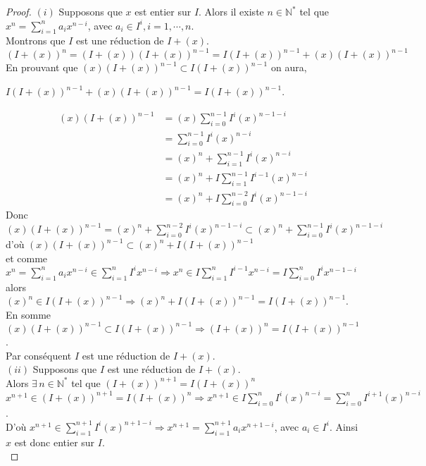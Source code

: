 \begin{proof}
	$(i)$ Supposons que $x$ est entier sur $I$. Alors il existe $n \in \mathbb{N^*}$ tel que $x^n = \displaystyle \sum_{i=1}^{n}{a_i x^{n-i}}$, avec $a_i \in I^i, i=1, \cdots ,n$.\\
	Montrons que $I$ est une réduction de $I + (x)$.\\
	$(I+(x))^n = (I+(x))(I+(x))^{n-1}= I(I+(x))^{n-1} + (x)(I+(x))^{n-1}$\\
	En prouvant que $(x)(I+(x))^{n-1} \subset I(I+(x))^{n-1}$ on aura,
	\begin{center}
		$I(I+(x))^{n-1} + (x)(I+(x))^{n-1} = I(I+(x))^{n-1}$.
	\end{center}
	\begin{align*}
		(x)(I+(x))^{n-1} &= (x)\displaystyle \sum_{i=0}^{n-1}{I^i (x)^{n-1-i}}\\
		&= \displaystyle \sum_{i=0}^{n-1}{I^i (x)^{n-i}}\\
		&= (x)^n + \displaystyle \sum_{i=1}^{n-1}{I^i (x)^{n-i}}\\
		&= (x)^n + I\displaystyle \sum_{i=1}^{n-1}{I^{i-1} (x)^{n-i}}\\
		&= (x)^n + I\displaystyle \sum_{i=0}^{n-2}{I^i (x)^{n-1-i}}
	\end{align*}
	Donc $(x)(I+(x))^{n-1} = (x)^n + \displaystyle \sum_{i=0}^{n-2}{I^i (x)^{n-1-i}} \subset (x)^n + \displaystyle \sum_{i=0}^{n-1}{I^i (x)^{n-1-i}}$\\
	d'où $(x)(I+(x))^{n-1} \subset (x)^n + I(I+(x))^{n-1}$\\ et comme $x^n = \displaystyle \sum_{i=1}^{n}{a_i x^{n-i}} \in \displaystyle \sum_{i=1}^{n}{I^i x^{n-i}} \Rightarrow x^n \in I\displaystyle \sum_{i=1}^{n}{I^{i-1} x^{n-i}} = I\displaystyle \sum_{i=0}^{n}{I^i x^{n-1-i}}$\\
	alors $(x)^n \in I(I+(x))^{n-1} \Rightarrow (x)^n + I(I+(x))^{n-1} = I(I+(x))^{n-1}$.\\
	En somme $(x)(I+(x))^{n-1} \subset I(I+(x))^{n-1} \Rightarrow (I+(x))^{n} = I(I+(x))^{n-1}$.\\
	Par conséquent $I$ est une réduction de $I + (x)$.\\
	$(ii)$ Supposons que $I$ est une réduction de $I + (x)$.\\
	Alors $\exists \, n \in \mathbb{N^*}$ tel que $(I + (x))^{n+1} = I(I + (x))^{n}$\\
	$x^{n+1} \in (I + (x))^{n+1} = I(I + (x))^{n} \Rightarrow x^{n+1} \in I\displaystyle \sum_{i=0}^{n}{I^i (x)^{n-i}} = \displaystyle \sum_{i=0}^{n}{I^{i+1} (x)^{n-i}}$.\\
	D'où $x^{n+1} \in \displaystyle \sum_{i=1}^{n+1}{I^i (x)^{n+1-i}} \Rightarrow x^{n+1} =  \displaystyle \sum_{i=1}^{n+1}{a_i x^{n+1-i}}$, avec $a_i \in I^i$. Ainsi $x$ est donc entier sur $I$.\\
\end{proof}

